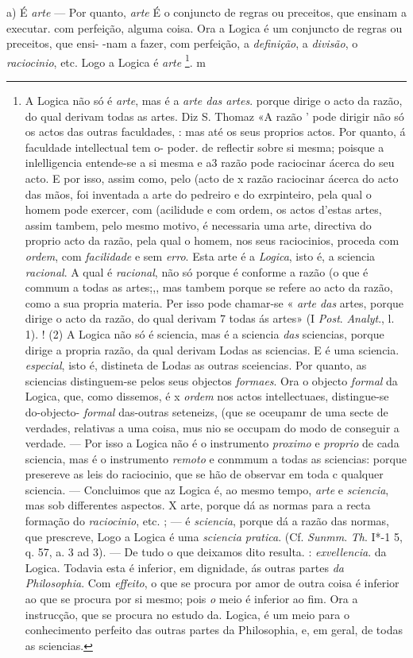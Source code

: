 a) É \emph{arte} --- Por quanto, \emph{arte} É o conjuncto de regras ou   preceitos, que ensinam a executar. com perfeição, alguma coisa. Ora a Logica é um conjuncto de regras ou preceitos, que ensi- -nam a fazer, com perfeição, a \emph{definição}, a \emph{divisão}, o \emph{raciocinio}, etc. Logo a Logica é \emph{arte} \footnote{A Logica não só é \emph{arte}, mas é a \emph{arte das artes}. porque dirige o acto da razão, do qual derivam todas as artes. Diz S. Thomaz «A razão ' pode dirigir não só os actos das outras faculdades, : mas até os seus proprios actos. Por quanto, á faculdade intellectual tem o- poder. de reflectir sobre si mesma; poisque a inlelligencia entende-se a si mesma e a3 razão pode raciocinar ácerca do seu acto. E por isso, assim como, pelo (acto de x razão raciocinar ácerca do acto das mãos, foi inventada a arte do pedreiro e do exrpinteiro, pela qual o homem pode exercer, com (acilidude e com ordem, os actos d'estas artes, assim tambem, pelo mesmo motivo, é necessaria uma arte, directiva do proprio acto da razão, pela qual o homem, nos seus raciocinios, proceda com \emph{ordem}, com \emph{facilidade} e sem \emph{erro}. Esta arte é a \emph{Logica}, isto é, a sciencia \emph{racional}. A qual é \emph{racional}, não só porque é conforme a razão (o que é commum a todas as artes;,, mas tambem porque se refere ao acto da razão, como a sua propria materia. Per isso pode chamar-se « \emph{arte das} artes, porque dirige o acto da razão, do qual derivam 7 todas ás artes» (I \emph{Post}. \emph{Analyt}., l. 1). ! (2) A Logica não só é sciencia, mas é a sciencia \emph{das} sciencias, porque dirige a propria razão, da qual derivam Lodas as sciencias. E é uma sciencia. \emph{especial}, isto é, distineta de Lodas as outras sceiencias. Por quanto, as sciencias distinguem-se pelos seus objectos \emph{formaes}. Ora o objecto \emph{formal} da Logica, que, como dissemos, é x \emph{ordem} nos actos intellectuaes, distingue-se do-objecto- \emph{formal} das-outras seteneizs, (que se oceupamr de uma secte de verdades, relativas a uma coisa, mus nio se occupam do modo de conseguir a verdade. --- Por isso a Logica não é o instrumento \emph{proximo} e \emph{proprio} de cada sciencia, mas é o instrumento \emph{remoto} e conmmum a todas as sciencias: porque presereve as leis do raciocinio, que se hão de observar em toda c qualquer sciencia. --- Concluimos que az Logica é, ao mesmo tempo, \emph{arte} e \emph{sciencia}, mas sob differentes aspectos. X arte, porque dá as normas para a recta formação do \emph{raciocinio}, etc. ; --- é \emph{sciencia}, porque dá a razão das normas, que prescreve, Logo a Logica é uma \emph{sciencia pratica}. (Cf. \emph{Sunmm}. \emph{Th}. I*-1 5, q. 57, a. 3 ad 3). --- De tudo o que deixamos dito resulta. : \emph{exvellencia}. da Logica. Todavia esta é inferior, em dignidade, ás outras partes \emph{da Philosophia}. Com \emph{effeito}, o que se procura por amor de outra coisa é inferior ao que se procura por si mesmo; pois \emph{o} meio é inferior ao fim. Ora a instrucção, que se procura no estudo da. Logica, é um meio para o conhecimento perfeito das outras partes da Philosophia, e, em geral, de todas as sciencias.}. m

